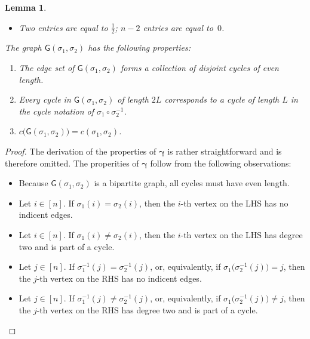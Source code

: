 \documentclass[journal,lettersize,twocolumn]{IEEEtran} %
\newtheorem{lemma}[theorem]{Lemma}
\newcommand{\vect}[1]{ \bm{#1} }
\newcommand{\vgam}{ \vect{\gamma} }
\newcommand{\sfG}{\mathsf{G}}
\begin{document}
\begin{appendices}
\begin{lemma}
\begin{enumerate}
\begin{itemize}
    \item Two entries are equal to $\frac{1}{2}$; $n \! - \! 2$ entries are
      equal to~$0$.

    \end{itemize}

  \end{enumerate}
  The graph $\sfG(\sigma_1,\sigma_2)$ has the following properties:
  \begin{enumerate}
    
  \item The edge set of $\sfG(\sigma_1,\sigma_2)$ forms a collection of
    disjoint cycles of even length.

  \item Every cycle in $\sfG(\sigma_1,\sigma_2)$ of length $2L$ corresponds to
    a cycle of length $L$ in the cycle notation of
    $\sigma_1 \circ \sigma_2^{-1}$.

  \item $c\bigl( \sfG(\sigma_1,\sigma_2) \bigr) = c(\sigma_1,\sigma_2)$.

  \end{enumerate}

\end{lemma}

%

\begin{proof}
  The derivation of the properties of $\vgam$ is rather straightforward and is
  therefore omitted. The properities of $\vgam$ follow from the following
  observations:
  \begin{itemize}
    
  \item Because $\sfG(\sigma_1,\sigma_2)$ is a bipartite graph, all cycles
    must have even length.

  \item Let $i \in [n]$. If $\sigma_1(i) = \sigma_2(i)$, then the $i$-th
    vertex on the LHS has no indicent edges.
    
  \item Let $i \in [n]$. If $\sigma_1(i) \neq \sigma_2(i)$, then the $i$-th
    vertex on the LHS has degree two and is part of a cycle.

  \item Let $j \in [n]$. If $\sigma_1^{-1}(j) = \sigma_2^{-1}(j)$, or,
    equivalently, if $\sigma_1\bigl( \sigma_2^{-1}(j) \bigr) = j$, then the
    $j$-th vertex on the RHS has no indicent edges.
    
  \item Let $j \in [n]$. If $\sigma_1^{-1}(j) \neq \sigma_2^{-1}(j)$, or,
    equivalently, if $\sigma_1\bigl( \sigma_2^{-1}(j) \bigr) \neq j$, then the
    $j$-th vertex on the RHS has degree two and is part of a cycle.


\end{itemize}
\end{proof}
\end{appendices}
\end{document}
